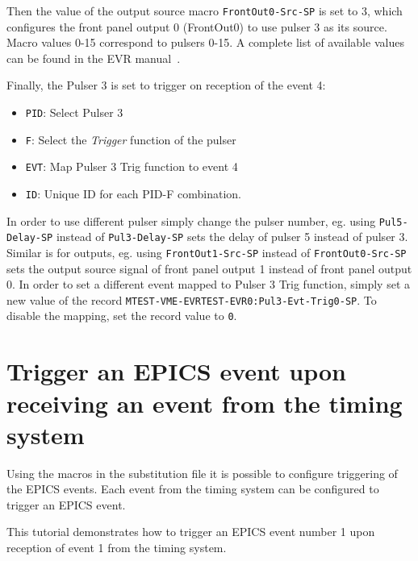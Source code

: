 \documentclass[12pt,a4paper]{article}
\begin{document}
Then the value of the output source macro \texttt{FrontOut0-Src-SP} is set to 3, which configures the front panel output 0 (FrontOut0) to use pulser 3 as its source. Macro values 0-15 correspond to pulsers 0-15. A complete list of available values can be found in the EVR manual~\cite{evr_manual}.

Finally, the Pulser 3 is set to trigger on reception of the event 4:
\begin{itemize}
	\item \texttt{PID}: Select Pulser 3
	\item \texttt{F}: Select the \textit{Trigger} function of the pulser
	\item \texttt{EVT}: Map Pulser 3 Trig function to event 4
	\item \texttt{ID}: Unique ID for each PID-F combination.
\end{itemize}

In order to use different pulser simply change the pulser number, eg. using \texttt{Pul5-Delay-SP} instead of \texttt{Pul3-Delay-SP} sets the delay of pulser 5 instead of pulser 3.
Similar is for outputs, eg. using \texttt{FrontOut1-Src-SP} instead of \texttt{FrontOut0-Src-SP} sets the output source signal of front panel output 1 instead of front panel output 0. In order to set a different event mapped to Pulser 3 Trig function, simply set a new value of the record \texttt{MTEST-VME-EVRTEST-EVR0:Pul3-Evt-Trig0-SP}. To disable the mapping, set the record value to \texttt{0}.

\section{Trigger an EPICS event upon receiving an event from the timing system}
Using the macros in the substitution file it is possible to configure triggering of the EPICS events. Each event from the timing system can be configured to trigger an EPICS event.

This tutorial demonstrates how to trigger an EPICS event number 1 upon reception of event 1 from the timing system.
\end{document}
